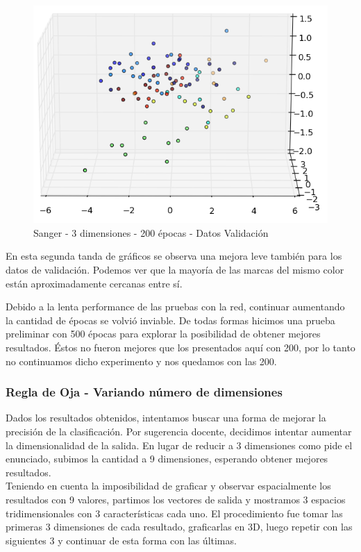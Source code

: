 \begin{figure}[h]
  \begin{center}
    \includegraphics[scale=0.4]{../img/ej1/sanger/sanger_3salida_200ep_validation_2.png}
  \caption{Sanger - 3 dimensiones - 200 épocas - Datos Validación}
  \end{center}
\end{figure}

En esta segunda tanda de gráficos se observa una mejora leve también para los datos de validación. Podemos ver que la mayoría de las marcas del mismo color están aproximadamente cercanas entre sí.

Debido a la lenta performance de las pruebas con la red, continuar aumentando la cantidad de épocas se volvió inviable. De todas formas hicimos una prueba preliminar con 500 épocas para explorar la posibilidad de obtener mejores resultados. Éstos no fueron mejores que los presentados aquí con 200, por lo tanto no continuamos dicho experimento y nos quedamos con las 200.
\newpage
\subsubsection{Regla de Oja - Variando número de dimensiones}

Dados los resultados obtenidos, intentamos buscar una forma de mejorar la precisión de la clasificación. Por sugerencia docente, decidimos intentar aumentar la dimensionalidad de la salida. En lugar de reducir a 3 dimensiones como pide el enunciado, subimos la cantidad a 9 dimensiones, esperando obtener mejores resultados. \\
Teniendo en cuenta la imposibilidad de graficar y observar espacialmente los resultados con 9 valores, partimos los vectores de salida y mostramos 3 espacios tridimensionales con 3 características cada uno. El procedimiento fue tomar las primeras 3 dimensiones de cada resultado, graficarlas en 3D, luego repetir con las siguientes 3 y continuar de esta forma con las últimas.

